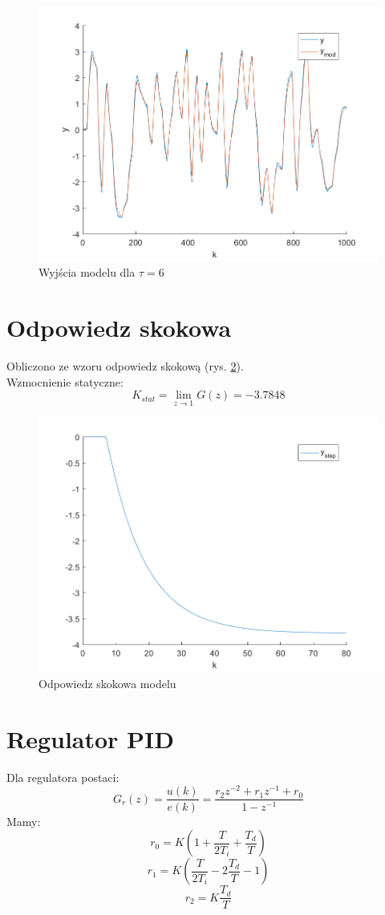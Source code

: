 \documentclass[a4paper, 10pt]{article}
\begin{document}
	\begin{figure}[H]
	\centering
	\includegraphics[width=0.9\linewidth]{z1_6}
	\caption{Wyjścia modelu dla $\tau=6$}
	\label{fig:z1_6}
	\end{figure}

	\section{Odpowiedz skokowa}
	Obliczono ze wzoru odpowiedz skokową (rys. \ref{fig:z2}).\\
	Wzmocnienie statyczne:
	\[K_{stat}=\lim_{z\rightarrow 1}G(z)=-3.7848\]
	\begin{figure}[H]
		\centering
		\includegraphics[width=0.9\linewidth]{z2}
		\caption{Odpowiedz skokowa modelu}
		\label{fig:z2}
		\end{figure}

	\section{Regulator PID}
	Dla regulatora postaci:
	\[G_r(z)=\frac{u(k)}{e(k)} = \frac{r_2z^{-2}+r_1z^{-1}+r_0}{1-z^{-1}}\]
	Mamy:
	\[r_0=K(1+\frac{T}{2T_i}+\frac{T_d}{T})\]
	\[r_1=K(\frac{T}{2T_i}-2\frac{T_d}{T}-1)\]
	\[r_2=K\frac{T_d}{T}\]
	
\end{document}
